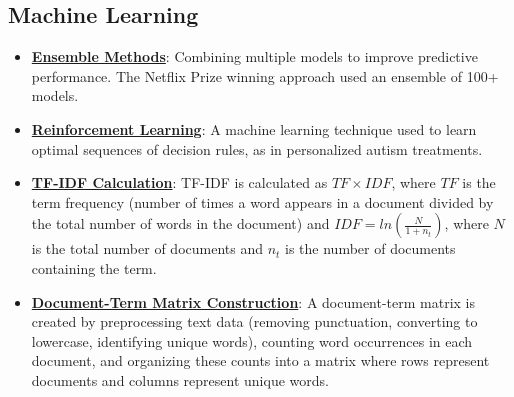 \documentclass{article}%
\begin{document}
%
\subsection{Machine Learning}%
\label{subsec:MachineLearning}%
\begin{itemize}[leftmargin=*]%
\item \href{https://purdue.brightspace.com/d2l/common/assets/pdfjs-d2l-dist/1.0.14-legacy/web/viewer.html?file=\%2Fcontent\%2Fenforced\%2F1095465-WL.202510.CS24200.LE1\%2F02L1-datas-intro.pdf\%3Fou\%3D1095465\&lang=en-us\&container=d2l-fileviewer-rendered-pdf\&fullscreen=d2l-fileviewer-rendered-pdf-dialog\&height=667#page=14}{\textbf{Ensemble Methods}}: Combining multiple models to improve predictive performance. The Netflix Prize winning approach used an ensemble of 100+ models.%
\item \href{https://purdue.brightspace.com/d2l/common/assets/pdfjs-d2l-dist/1.0.14-legacy/web/viewer.html?file=\%2Fcontent\%2Fenforced\%2F1095465-WL.202510.CS24200.LE1\%2F02L1-datas-intro.pdf\%3Fou\%3D1095465\&lang=en-us\&container=d2l-fileviewer-rendered-pdf\&fullscreen=d2l-fileviewer-rendered-pdf-dialog\&height=667#page=20}{\textbf{Reinforcement Learning}}: A machine learning technique used to learn optimal sequences of decision rules, as in personalized autism treatments.%
\item \href{https://purdue.brightspace.com/d2l/common/assets/pdfjs-d2l-dist/1.0.14-legacy/web/viewer.html?file=\%2Fcontent\%2Fenforced\%2F1095465-WL.202510.CS24200.LE1\%2F05L1-parsing.pdf\%3Fou\%3D1095465\&lang=en-us\&container=d2l-fileviewer-rendered-pdf\&fullscreen=d2l-fileviewer-rendered-pdf-dialog\&height=667#page=25}{\textbf{TF-IDF Calculation}}: TF-IDF is calculated as $TF \times IDF$, where $TF$ is the term frequency (number of times a word appears in a document divided by the total number of words in the document) and $IDF = ln(\frac{N}{1 + n_t})$, where $N$ is the total number of documents and $n_t$ is the number of documents containing the term.%
\item \href{https://purdue.brightspace.com/d2l/common/assets/pdfjs-d2l-dist/1.0.14-legacy/web/viewer.html?file=\%2Fcontent\%2Fenforced\%2F1095465-WL.202510.CS24200.LE1\%2F05L1-parsing.pdf\%3Fou\%3D1095465\&lang=en-us\&container=d2l-fileviewer-rendered-pdf\&fullscreen=d2l-fileviewer-rendered-pdf-dialog\&height=667#page=26}{\textbf{Document-Term Matrix Construction}}: A document-term matrix is created by preprocessing text data (removing punctuation, converting to lowercase, identifying unique words), counting word occurrences in each document, and organizing these counts into a matrix where rows represent documents and columns represent unique words.%

\end{itemize}
\end{document}

